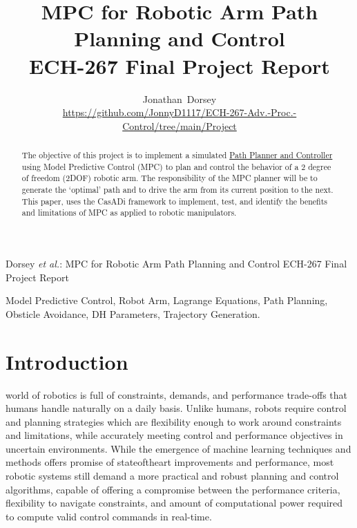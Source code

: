 \documentclass[journal]{IEEEtran}
\begin{document}
\title{MPC for Robotic Arm Path Planning and Control \\ ECH-267 Final Project Report}


\author{Jonathan~Dorsey  \\  \url{https://github.com/JonnyD1117/ECH-267-Adv.-Proc.-Control/tree/main/Project}}


%
{Dorsey \MakeLowercase{\textit{et al.}}: MPC for Robotic Arm Path Planning and Control ECH-267 Final Project Report}

\maketitle

\begin{abstract}
  The objective of this project is to implement a simulated \underline{Path Planner and Controller} using Model Predictive Control (MPC) to plan and control the behavior of a 2 degree of freedom (2DOF) robotic arm. The responsibility of the MPC planner will be to generate the `optimal' path and to drive the arm from its current position to the next. This paper, uses the CasADi framework to implement, test, and identify the benefits and limitations of MPC as applied to robotic manipulators.
\end{abstract}

\begin{IEEEkeywords}
Model Predictive Control, Robot Arm, Lagrange Equations, Path Planning, Obsticle Avoidance, DH Parameters, Trajectory Generation.
\end{IEEEkeywords}


\IEEEpeerreviewmaketitle

\section{Introduction}

 world of robotics is full of constraints, demands, and performance trade-offs that humans handle naturally on a daily basis. Unlike humans, robots require control and planning strategies which are flexibility enough to work around constraints and limitations, while accurately meeting control and performance objectives in uncertain environments. While the emergence of machine learning techniques and methods offers promise of stateoftheart improvements and performance, most robotic systems still demand a more practical and robust planning and control algorithms, capable of offering a compromise between the performance criteria, flexibility to navigate constraints, and amount of computational power required to compute valid control commands in real-time. \\
\end{document}
